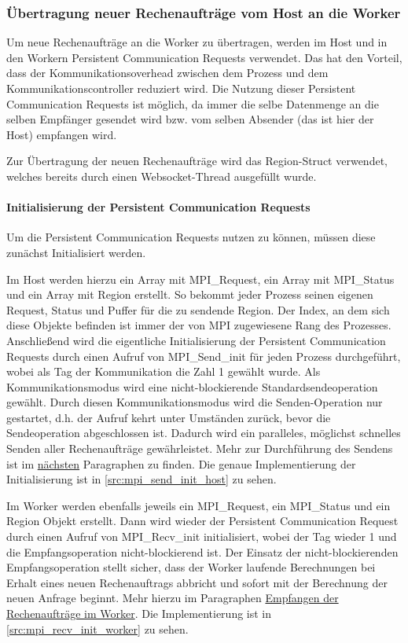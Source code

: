 \subsubsection{Übertragung neuer Rechenaufträge vom Host an die Worker}

Um neue Rechenaufträge an die Worker zu übertragen, werden im Host und in den Workern Persistent Communication Requests verwendet. Das hat den Vorteil, dass der Kommunikationsoverhead zwischen dem Prozess und dem Kommunikationscontroller reduziert wird. Die Nutzung dieser Persistent Communication Requests ist möglich, da immer die selbe Datenmenge an die selben Empfänger gesendet wird bzw. vom selben Absender (das ist hier der Host) empfangen wird.

Zur Übertragung der neuen Rechenaufträge wird das Region-Struct verwendet, welches bereits durch einen Websocket-Thread ausgefüllt wurde.

\paragraph{Initialisierung der Persistent Communication Requests}\label{para:persistent_init}

Um die Persistent Communication Requests nutzen zu können, müssen diese zunächst Initialisiert werden.

Im Host werden hierzu ein Array mit MPI\_Request, ein Array mit MPI\_Status und ein Array mit Region erstellt. So bekommt jeder Prozess seinen eigenen Request, Status und Puffer für die zu sendende Region. Der Index, an dem sich diese Objekte befinden ist immer der von MPI zugewiesene Rang des Prozesses.
Anschließend wird die eigentliche Initialisierung der Persistent Communication Requests durch einen Aufruf von MPI\_Send\_init für jeden Prozess durchgeführt, wobei als Tag der Kommunikation die Zahl 1 gewählt wurde. Als Kommunikationsmodus wird eine nicht-blockierende Standardsendeoperation gewählt. Durch diesen Kommunikationsmodus wird die Senden-Operation nur gestartet, d.h. der Aufruf kehrt unter Umständen zurück, bevor die Sendeoperation abgeschlossen ist. Dadurch wird ein paralleles, möglichst schnelles Senden aller Rechenaufträge gewährleistet. Mehr zur Durchführung des Sendens ist im \hyperref[para:send_host]{nächsten} Paragraphen zu finden.
Die genaue Implementierung der Initialisierung ist in \autoref{src:mpi_send_init_host} zu sehen.

Im Worker werden ebenfalls jeweils ein MPI\_Request, ein MPI\_Status und ein Region Objekt erstellt. Dann wird wieder der Persistent Communication Request durch einen Aufruf von MPI\_Recv\_init initialisiert, wobei der Tag wieder 1 und die Empfangsoperation nicht-blockierend ist. Der Einsatz der nicht-blockierenden Empfangsoperation stellt sicher, dass der Worker laufende Berechnungen bei Erhalt eines neuen Rechenauftrags abbricht und sofort mit der Berechnung der neuen Anfrage beginnt. Mehr hierzu im Paragraphen \hyperref[para:recv_worker]{Empfangen der Rechenaufträge im Worker}.
Die Implementierung ist in \autoref{src:mpi_recv_init_worker} zu sehen.

